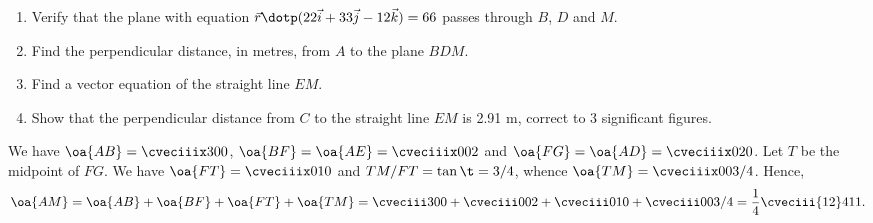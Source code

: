 \begin{problem}
    \begin{enumerate}
        \item Verify that the plane with equation $\vec r \dotp (22\vec i + 33\vec j - 12\vec k) = 66$ passes through $B$, $D$ and $M$.
        \item Find the perpendicular distance, in metres, from $A$ to the plane $BDM$.
        \item Find a vector equation of the straight line $EM$.
        \item Show that the perpendicular distance from $C$ to the straight line $EM$ is 2.91 m, correct to 3 significant figures.
    \end{enumerate}
\end{problem}
\clearpage
\begin{solution}
    \begin{ppart}
        We have $\oa{AB} = \cveciiix300$, $\oa{BF} = \oa{AE} = \cveciiix002$ and $\oa{FG} = \oa{AD} = \cveciiix020$. Let $T$ be the midpoint of $FG$. We have $\oa{FT} = \cveciiix010$ and $TM/FT = \tan\t = 3/4$, whence $\oa{TM} = \cveciiix00{3/4}$. Hence, \[\oa{AM} = \oa{AB} + \oa{BF} + \oa{FT} + \oa{TM} = \cveciii300 + \cveciii002 + \cveciii010 + \cveciii00{3/4} = \frac14\cveciii{12}4{11}.\]


\end{ppart}
\end{solution}
